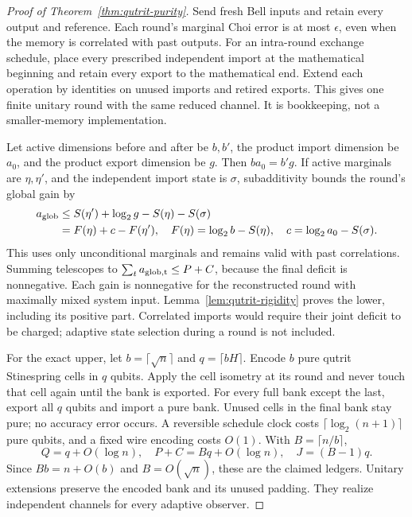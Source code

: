 \begin{proof}[Proof of Theorem~\ref{thm:qutrit-purity}]
Send fresh Bell inputs and retain every output and reference.
Each round's marginal Choi error is at most $\epsilon$, even when
the memory is correlated with past outputs.
For an intra-round exchange schedule, place every prescribed independent
import at the mathematical beginning and retain every export to the
mathematical end. Extend each operation by identities on unused imports
and retired exports. This gives one finite unitary round with the same
reduced channel. It is bookkeeping, not a smaller-memory implementation.

Let active dimensions before and after be $b,b'$, the product import
dimension be $a_0$, and the product export dimension be $g$. Then
$ba_0=b'g$. If active marginals are $\eta,\eta'$, and the independent
import state is $\sigma$, subadditivity bounds the round's global gain by
\begin{align*}
 a_{\rm glob}
 &\leq S(\eta')+\log_2g-S(\eta)-S(\sigma)\\
 &=F(\eta)+c-F(\eta'),
 \quad F(\eta)=\log_2b-S(\eta),\quad
 c=\log_2a_0-S(\sigma).
\end{align*}
This uses only unconditional marginals and remains valid with past
correlations. Summing telescopes to $\sum_ta_{\rm glob,t}\leq P+C$,
because the final deficit is nonnegative. Each gain is nonnegative
for the reconstructed round with maximally mixed system input.
Lemma~\ref{lem:qutrit-rigidity} proves the lower, including its positive
part. Correlated imports would require their joint deficit to be charged;
adaptive state selection during a round is not included.

For the exact upper, let $b=\lceil\sqrt n\rceil$ and
$q=\lceil bH\rceil$. Encode $b$ pure qutrit Stinespring cells in
$q$ qubits. Apply the cell isometry at its round and never touch that cell
again until the bank is exported. For every full bank except the last,
export all $q$ qubits and import a pure bank. Unused cells in the final
bank stay pure; no accuracy error occurs. A reversible schedule clock
costs $\lceil\log_2(n+1)\rceil$ pure qubits, and a fixed wire encoding
costs $O(1)$. With $B=\lceil n/b\rceil$,
\[
 Q=q+O(\log n),\quad P+C=Bq+O(\log n),\quad J=(B-1)q.
\]
Since $Bb=n+O(b)$ and $B=O(\sqrt n)$, these are the claimed ledgers.
Unitary extensions preserve the encoded bank and its unused padding.
They realize independent channels for every adaptive observer.
\end{proof}

